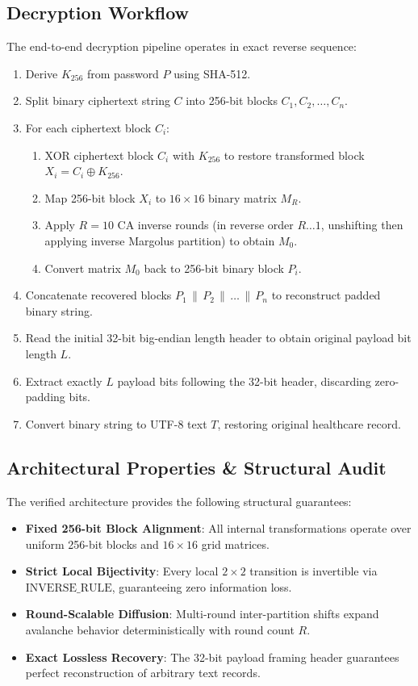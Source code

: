 \subsection{Decryption Workflow}
\label{subsec:decryption_workflow}
The end-to-end decryption pipeline operates in exact reverse sequence:
\begin{enumerate}
    \item Derive $K_{256}$ from password $P$ using SHA-512.
    \item Split binary ciphertext string $C$ into 256-bit blocks $C_1, C_2, \dots, C_n$.
    \item For each ciphertext block $C_i$:
    \begin{enumerate}
        \item XOR ciphertext block $C_i$ with $K_{256}$ to restore transformed block $X_i = C_i \oplus K_{256}$.
        \item Map 256-bit block $X_i$ to $16 \times 16$ binary matrix $M_R$.
        \item Apply $R = 10$ CA inverse rounds (in reverse order $R \dots 1$, unshifting then applying inverse Margolus partition) to obtain $M_0$.
        \item Convert matrix $M_0$ back to 256-bit binary block $P_i$.
    \end{enumerate}
    \item Concatenate recovered blocks $P_1 \,\|\, P_2 \,\|\, \dots \,\|\, P_n$ to reconstruct padded binary string.
    \item Read the initial 32-bit big-endian length header to obtain original payload bit length $L$.
    \item Extract exactly $L$ payload bits following the 32-bit header, discarding zero-padding bits.
    \item Convert binary string to UTF-8 text $T$, restoring original healthcare record.
\end{enumerate}

\subsection{Architectural Properties \& Structural Audit}
\label{subsec:properties}
The verified architecture provides the following structural guarantees:
\begin{itemize}
    \item \textbf{Fixed 256-bit Block Alignment}: All internal transformations operate over uniform 256-bit blocks and $16 \times 16$ grid matrices.
    \item \textbf{Strict Local Bijectivity}: Every local $2 \times 2$ transition is invertible via $\text{INVERSE\_RULE}$, guaranteeing zero information loss.
    \item \textbf{Round-Scalable Diffusion}: Multi-round inter-partition shifts expand avalanche behavior deterministically with round count $R$.
    \item \textbf{Exact Lossless Recovery}: The 32-bit payload framing header guarantees perfect reconstruction of arbitrary text records.
\end{itemize}

